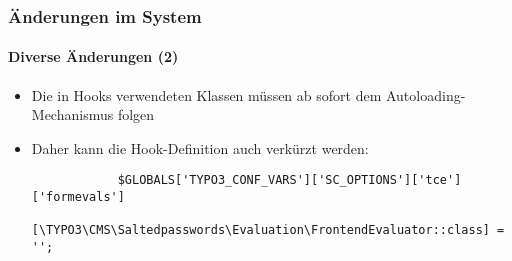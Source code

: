 \begin{frame}[fragile]
	\frametitle{Änderungen im System}
	\framesubtitle{Diverse Änderungen (2)}

	\lstset{basicstyle=\tiny\ttfamily}

	\begin{itemize}

		\item Die in Hooks verwendeten Klassen müssen ab sofort dem Autoloading-Mechanismus folgen
		\item Daher kann die Hook-Definition auch verkürzt werden:

		\begin{lstlisting}
			$GLOBALS['TYPO3_CONF_VARS']['SC_OPTIONS']['tce']['formevals']
			  [\TYPO3\CMS\Saltedpasswords\Evaluation\FrontendEvaluator::class] = '';
		\end{lstlisting}

	\end{itemize}

	\breakingchange

\end{frame}

